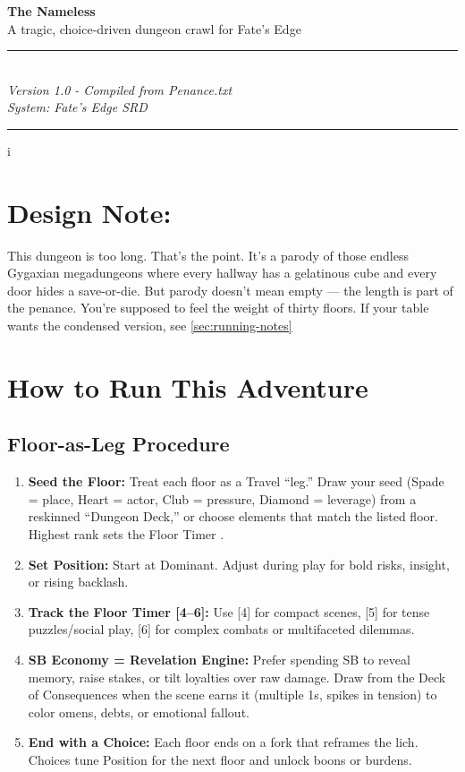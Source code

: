 \documentclass[18pt, letterpaper, twoside]{article}
\begin{document}


\begin{center}
    {\Huge \textbf{The Nameless}}\\[1em]
    {\Large A tragic, choice-driven dungeon crawl for Fate's Edge}\\[2em]
    \rule{\textwidth}{1pt}\\[1em]
    {\large \textit{Version 1.0 - Compiled from Penance.txt}}\\[0.5em]
    {\large \textit{System: Fate's Edge SRD}}\\[1em]
    \rule{\textwidth}{1pt}
\end{center}

\thispagestyle{empty}
\newpage
\setcounter{page}{1}

\tableofcontents
\newpage

i\section*{Design Note:}
This dungeon is too long. That's the point. It's a parody of those endless Gygaxian megadungeons where every hallway has a gelatinous cube and every door hides a save-or-die. But parody doesn't mean empty --- the length is part of the penance. You're supposed to feel the weight of thirty floors. If your table wants the condensed version, see \ref{sec:running-notes}



\section{How to Run This Adventure}

\subsection{Floor-as-Leg Procedure}
\begin{enumerate}[leftmargin=*]
    \item \textbf{Seed the Floor:} Treat each floor as a Travel ``leg.'' Draw your seed (Spade = place, Heart = actor, Club = pressure, Diamond = leverage) from a reskinned ``Dungeon Deck,'' or choose elements that match the listed floor. Highest rank sets the Floor Timer .
    \item \textbf{Set Position:} Start at Dominant. Adjust during play for bold risks, insight, or rising backlash.
    \item \textbf{Track the Floor Timer [4--6]:} Use [4] for compact scenes, [5] for tense puzzles/social play, [6] for complex combats or multifaceted dilemmas.
    \item \textbf{SB Economy = Revelation Engine:} Prefer spending SB to reveal memory, raise stakes, or tilt loyalties over raw damage. Draw from the Deck of Consequences when the scene earns it (multiple 1s, spikes in tension) to color omens, debts, or emotional fallout.
    \item \textbf{End with a Choice:} Each floor ends on a fork that reframes the lich. Choices tune Position for the next floor and unlock boons or burdens.
\end{enumerate}
\end{document}
